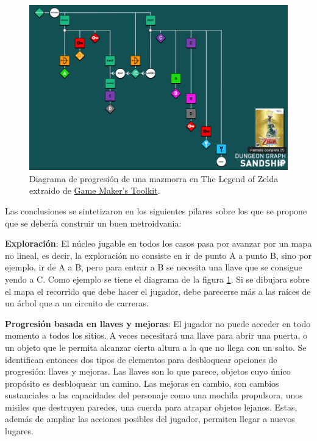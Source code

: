 \begin{figure}[h]
    \centering
    \includegraphics[scale=0.28]{img/mark-brown.png}
    \caption[Diagrama de progresión de una mazmorra en The Legend of Zelda]{Diagrama de progresión de una mazmorra en The Legend of Zelda extraido de \href{https://www.youtube.com/@GMTK}{Game Maker's Toolkit}.}
    \label{fig:markbrown}
\end{figure}

Las conclusiones se sintetizaron en los siguientes pilares sobre los que se propone que se debería construir un buen metroidvania:

\textbf{Exploración}: El núcleo jugable en todos los casos pasa por avanzar por un mapa no lineal, es decir, la exploración no consiste en ir de punto A a punto B, sino por ejemplo, ir de A a B, pero para entrar a B se necesita una llave que se consigue yendo a C. Como ejemplo se tiene el diagrama de la figura \ref{fig:markbrown}. Si se dibujara sobre el mapa el recorrido que debe hacer el jugador, debe parecerse más a las raíces de un árbol que a un circuito de carreras.


\textbf{Progresión basada en llaves y mejoras}: El jugador no puede acceder en todo momento a todos los sitios. A veces necesitará una llave para abrir una puerta, o un objeto que le permita alcanzar cierta altura a la que no llega con un salto. Se identifican entonces dos tipos de elementos para desbloquear opciones de progresión: llaves y mejoras. Las llaves son lo que parece, objetos cuyo único propósito es desbloquear un camino. Las mejoras en cambio, son cambios sustanciales a las capacidades del personaje como una mochila propulsora, unos misiles que destruyen paredes, una cuerda para atrapar objetos lejanos. Estas, además de ampliar las acciones posibles del jugador, permiten llegar a nuevos lugares.


